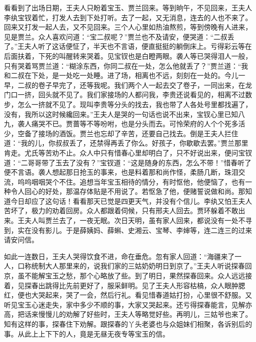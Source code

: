 \begin{parag}
    看看到了出场日期，王夫人只盼着宝玉、贾兰回来。等到晌午，不见回来，王夫人李纨宝钗着忙，打发人去到下处打听。去了一起，又无消息，连去的人也不来了。回来又打发一起人去，又不见回来。三个人心里如热油熬煎，等到傍晚有人进来，见是贾兰。众人喜欢问道：“宝二叔呢？”贾兰也不及请安，便哭道：“二叔丢了。”王夫人听了这话便怔了，半天也不言语，便直挺挺的躺倒床上。亏得彩云等在后面扶着，下死的叫醒转来哭着。见宝钗也是白瞪两眼。袭人等已哭得泪人一般，只有哭着骂贾兰道：“糊涂东西，你同二叔在一处，怎么他就丢了？”贾兰道：“我和二叔在下处，是一处吃一处睡。进了场，相离也不远，刻刻在一处的。今儿一早，二叔的卷子早完了，还等我呢。我们两个人一起去交了卷子，一同出来，在龙门口一挤，回头就不见了。我们家接场的人都问我，李贵还说看见的，相离不过数步，怎么一挤就不见了。现叫李贵等分头的找去，我也带了人各处号里都找遍了，没有，我所以这时候纔回来。”王夫人是哭的一句话也说不出来，宝钗心里已知八九，袭人痛哭不已。贾蔷等不等吩咐，也是分头而去。可怜荣府的人个个死多活少，空备了接场的酒饭。贾兰也忘却了辛苦，还要自己找去。倒是王夫人拦住道：“我的儿，你叔叔丢了，还禁得再丢了你么。好孩子，你歇歇去罢。”贾兰那里肯走。尤氏等苦劝不止。众人中只有惜春心里却明白了，只不好说出来，便问宝钗道：“二哥哥带了玉去了没有？”宝钗道：“这是随身的东西，怎么不带！”惜春听了便不言语。袭人想起那日抢玉的事来，也是料着那和尚作怪，柔肠几断，珠泪交流，呜呜咽咽哭个不住。追想当年宝玉相待的情分，有时怄他，他便恼了，也有一种令人回心的好处，那温存体贴是不用说了。若怄急了他，便赌誓说做和尚。那知道今日却应了这句话！看看那天已觉是四更天气，并没有个信儿。李纨又怕王夫人苦坏了，极力的劝着回房。众人都跟着伺候，只有邢夫人回去。贾环躲着不敢出来。王夫人叫贾兰去了，一夜无眠。次日天明，虽有家人回来，都说没有一处不寻到，实在没有影儿。于是薛姨妈、薛蝌、史湘云、宝琴、李婶等，连二连三的过来请安问信。
\end{parag}


\begin{parag}
    如此一连数日，王夫人哭得饮食不进，命在垂危。忽有家人回道：“海疆来了一人，口称统制大人那里来的，说我们家的三姑奶奶明日到京了。”王夫人听说探春回京，虽不能解宝玉之愁，那个心略放了些。到了明日，果然探春回来。众人远远接着，见探春出跳得比先前更好了，服采鲜明。见了王夫人形容枯槁，众人眼肿腮红，便也大哭起来，哭了一会，然后行礼。看见惜春道姑打扮，心里很不舒服。又听见宝玉心迷走失，家中多少不顺的事，大家又哭起来。还亏得探春能言，见解亦高，把话来慢慢儿的劝解了好些时，王夫人等略觉好些。再明儿，三姑爷也来了。知有这样的事，探春住下劝解。跟探春的丫头老婆也与众姐妹们相聚，各诉别后的事。从此上上下下的人，竟是无昼无夜专等宝玉的信。
\end{parag}


